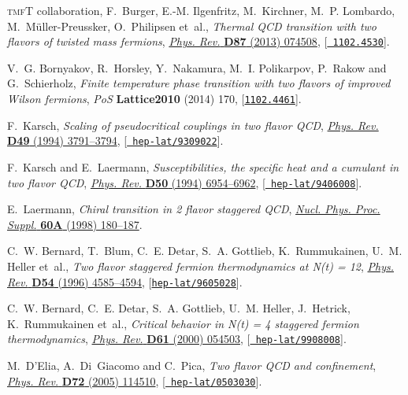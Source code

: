 \documentclass{PoS}
\begin{document}
\begin{thebibliography}{100}
{\scshape tmfT} collaboration, F.~Burger, E.-M. Ilgenfritz, M.~Kirchner, M.~P.
  Lombardo, M.~M{\"u}ller-Preussker, O.~Philipsen et~al., \emph{{Thermal QCD
  transition with two flavors of twisted mass fermions}},
  \href{http://dx.doi.org/10.1103/PhysRevD.87.074508}{\emph{Phys. Rev.} {\bf
  D87} (2013) 074508}, [\href{https://arxiv.org/abs/1102.4530}{{\tt
  1102.4530}}].

V.~G. Bornyakov, R.~Horsley, Y.~Nakamura, M.~I. Polikarpov, P.~Rakow and
  G.~Schierholz, \emph{{Finite temperature phase transition with two flavors of
  improved Wilson fermions}}, {\emph{PoS} {\bf Lattice2010} (2014) 170},
  [\href{https://arxiv.org/abs/1102.4461}{{\tt 1102.4461}}].

F.~Karsch, \emph{{Scaling of pseudocritical couplings in two flavor QCD}},
  \href{http://dx.doi.org/10.1103/PhysRevD.49.3791}{\emph{Phys. Rev.} {\bf D49}
  (1994) 3791--3794}, [\href{https://arxiv.org/abs/hep-lat/9309022}{{\tt
  hep-lat/9309022}}].

F.~Karsch and E.~Laermann, \emph{{Susceptibilities, the specific heat and a
  cumulant in two flavor QCD}},
  \href{http://dx.doi.org/10.1103/PhysRevD.50.6954}{\emph{Phys. Rev.} {\bf D50}
  (1994) 6954--6962}, [\href{https://arxiv.org/abs/hep-lat/9406008}{{\tt
  hep-lat/9406008}}].

E.~Laermann, \emph{{Chiral transition in 2 flavor staggered QCD}},
  \href{http://dx.doi.org/10.1016/S0920-5632(97)00479-9}{\emph{Nucl. Phys.
  Proc. Suppl.} {\bf 60A} (1998) 180--187}.

C.~W. Bernard, T.~Blum, C.~E. Detar, S.~A. Gottlieb, K.~Rummukainen, U.~M.
  Heller et~al., \emph{{Two flavor staggered fermion thermodynamics at N(t) =
  12}}, \href{http://dx.doi.org/10.1103/PhysRevD.54.4585}{\emph{Phys. Rev.}
  {\bf D54} (1996) 4585--4594},
  [\href{https://arxiv.org/abs/hep-lat/9605028}{{\tt hep-lat/9605028}}].

C.~W. Bernard, C.~E. Detar, S.~A. Gottlieb, U.~M. Heller, J.~Hetrick,
  K.~Rummukainen et~al., \emph{{Critical behavior in N(t) = 4 staggered fermion
  thermodynamics}},
  \href{http://dx.doi.org/10.1103/PhysRevD.61.054503}{\emph{Phys. Rev.} {\bf
  D61} (2000) 054503}, [\href{https://arxiv.org/abs/hep-lat/9908008}{{\tt
  hep-lat/9908008}}].

M.~D'Elia, A.~Di~Giacomo and C.~Pica, \emph{{Two flavor QCD and confinement}},
  \href{http://dx.doi.org/10.1103/PhysRevD.72.114510}{\emph{Phys. Rev.} {\bf
  D72} (2005) 114510}, [\href{https://arxiv.org/abs/hep-lat/0503030}{{\tt
  hep-lat/0503030}}].


\end{thebibliography}
\end{document}
